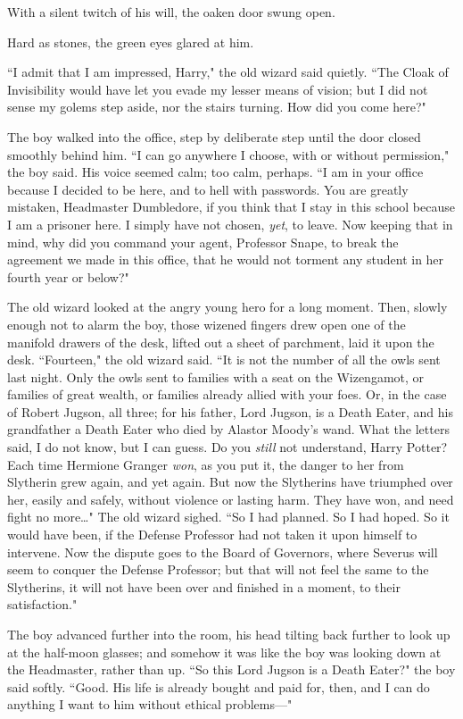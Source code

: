 With a silent twitch of his will, the oaken door swung open.

Hard as stones, the green eyes glared at him.

``I admit that I am impressed, Harry," the old wizard said quietly. ``The Cloak of Invisibility would have let you evade my lesser means of vision; but I did not sense my golems step aside, nor the stairs turning. How did you come here?"

The boy walked into the office, step by deliberate step until the door closed smoothly behind him. ``I can go anywhere I choose, with or without permission," the boy said. His voice seemed calm; too calm, perhaps. ``I am in your office because I decided to be here, and to hell with passwords. You are greatly mistaken, Headmaster Dumbledore, if you think that I stay in this school because I am a prisoner here. I simply have not chosen, \emph{yet}, to leave. Now keeping that in mind, why did you command your agent, Professor Snape, to break the agreement we made in this office, that he would not torment any student in her fourth year or below?"

The old wizard looked at the angry young hero for a long moment. Then, slowly enough not to alarm the boy, those wizened fingers drew open one of the manifold drawers of the desk, lifted out a sheet of parchment, laid it upon the desk. ``Fourteen," the old wizard said. ``It is not the number of all the owls sent last night. Only the owls sent to families with a seat on the Wizengamot, or families of great wealth, or families already allied with your foes. Or, in the case of Robert Jugson, all three; for his father, Lord Jugson, is a Death Eater, and his grandfather a Death Eater who died by Alastor Moody's wand. What the letters said, I do not know, but I can guess. Do you \emph{still} not understand, Harry Potter? Each time Hermione Granger \emph{won}, as you put it, the danger to her from Slytherin grew again, and yet again. But now the Slytherins have triumphed over her, easily and safely, without violence or lasting harm. They have won, and need fight no more{\ldots}" The old wizard sighed. ``So I had planned. So I had hoped. So it would have been, if the Defense Professor had not taken it upon himself to intervene. Now the dispute goes to the Board of Governors, where Severus will seem to conquer the Defense Professor; but that will not feel the same to the Slytherins, it will not have been over and finished in a moment, to their satisfaction."

The boy advanced further into the room, his head tilting back further to look up at the half-moon glasses; and somehow it was like the boy was looking down at the Headmaster, rather than up. ``So this Lord Jugson is a Death Eater?" the boy said softly. ``Good. His life is already bought and paid for, then, and I can do anything I want to him without ethical problems---"

